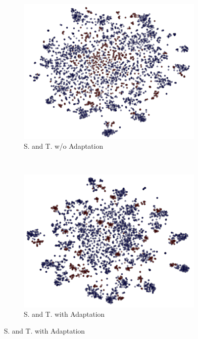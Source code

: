 \begin{figure}[ht]
    \begin{subfigure}[b]{0.5\textwidth}
        \includegraphics[width=\textwidth]{na_st.png}
        \caption{S. and T. w/o Adaptation}
        \label{fig:gull}
    \end{subfigure}~\begin{subfigure}[b]{0.5\textwidth}
        \includegraphics[width=\textwidth]{st.png}
        \caption{S. and T. with Adaptation}
    \end{subfigure}


\end{figure}
